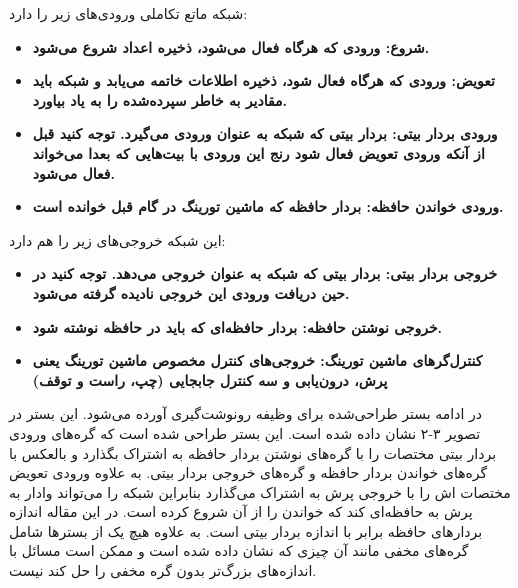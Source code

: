 شبکه ماتع تکاملی ورودی‌های زیر را دارد:
\begin{itemize}
\item \bf{شروع}: ورودی که هرگاه فعال می‌شود، ذخیره اعداد شروع می‌شود.
\item \bf{تعویض}: ورودی که هرگاه فعال شود، ذخیره اطلاعات خاتمه می‌یابد و شبکه باید مقادیر به خاطر سپرده‌شده را به یاد بیاورد.
\item \bf{ورودی بردار بیتی}: بردار بیتی که شبکه به عنوان ورودی می‌گیرد. توجه کنید قبل از آنکه ورودی تعویض فعال شود رنج این ورودی با بیت‌هایی که بعدا می‌خواند فعال می‌شود.
\item \bf{ورودی خواندن حافظه}: بردار حافظه که ماشین تورینگ در گام قبل خوانده است.\cite{merrild2018hyperntm}
\end{itemize}

این شبکه خروجی‌های زیر را هم دارد:
\begin{itemize}
\item \bf{خروجی بردار بیتی}: بردار بیتی که شبکه به عنوان خروجی می‌دهد. توجه کنید در حین دریافت ورودی این خروجی نادیده گرفته می‌شود.
\item \bf{خروجی نوشتن حافظه}: بردار حافظه‌ای که باید در حافظه نوشته شود.
\item \bf{کنترل‌گر‌های ماشین تورینگ}: خروجی‌های کنترل مخصوص ماشین تورینگ یعنی پرش، درون‌یابی و سه کنترل جابجایی (چپ، راست و توقف)\cite{merrild2018hyperntm} 
\end{itemize}

در ادامه بستر طراحی‌شده برای وظیفه رونوشت‌گیری آورده می‌شود. این بستر در تصویر ۳-۲ نشان داده شده است. این بستر طراحی شده است که گره‌های ورودی بردار بیتی مختصات  را با گره‌های نوشتن بردار حافظه به اشتراک بگذارد و بالعکس با گره‌های خواندن بردار حافظه و گره‌های خروجی بردار بیتی.
به علاوه ورودی تعویض مختصات  اش را با خروجی پرش به اشتراک می‌گذارد بنابراین شبکه را می‌تواند وادار به پرش به حافظه‌ای کند که خواندن را از آن شروع کرده است. در این مقاله اندازه بردارهای حافظه برابر با اندازه بردار بیتی است. 
به علاوه هیچ یک از بسترها شامل گره‌های مخفی مانند آن چیزی که نشان داده شده است و ممکن است مسائل  با اندازه‌های بزرگ‌تر بدون گره مخفی را حل کند نیست.\cite{merrild2018hyperntm}


